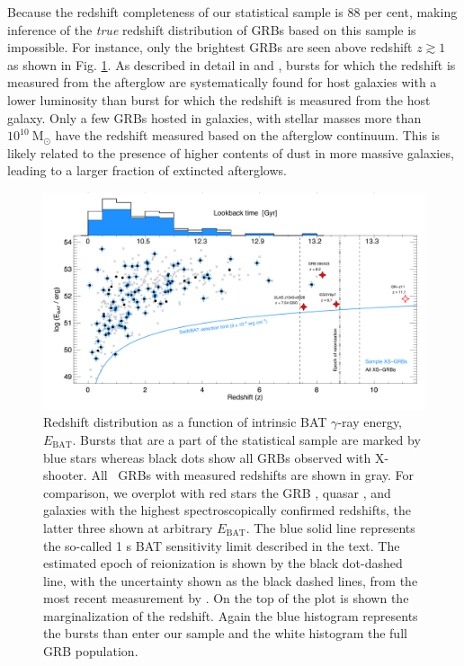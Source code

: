 \documentclass{aa}    %
\begin{document}
Because the redshift completeness of our statistical sample is 88 per cent,
making inference of the \textit{true} redshift distribution of GRBs based on
this sample is impossible. %
For instance, only the brightest GRBs are seen above redshift $z \gtrsim 1$ as
shown in Fig. \ref{fig:z}. As described in detail in \citet{Hjorth2012} and
\citet{Perley2016b}, bursts for which the redshift is measured from the
afterglow are systematically found for host galaxies with a lower luminosity
than burst for which the redshift is measured from the host galaxy. Only a few
GRBs hosted in galaxies, with stellar masses more than
$10^{10}~\mathrm{M}_\odot$ have the redshift measured based on the afterglow
continuum. This is likely related to the presence of higher contents of dust in
more massive galaxies, leading to a larger fraction of extincted afterglows.



\begin{figure}[!ht]
	\centering \includegraphics[width=16cm]{figures/XSGRB_redshift.pdf}
\caption{Redshift distribution as a function of intrinsic BAT $\gamma$-ray
	energy, $E_{\mathrm{BAT}}$. Bursts that are a part of the statistical sample
	are marked by blue stars whereas black dots show all GRBs observed with
	X-shooter. All \swift~GRBs with measured redshifts are shown in gray. For
	comparison, we overplot with red stars the GRB \citep{Tanvir2009b,
		Salvaterra2009a}, quasar \citep{Banados2017}, and galaxies \citep{Zitrin2015,
		Oesch2016} with the highest spectroscopically confirmed redshifts, the latter
	three shown at arbitrary $E_{\mathrm{BAT}}$. The blue solid line represents the
	so-called 1 s BAT sensitivity limit described in the text. The estimated epoch
	of reionization is shown by the black dot-dashed line, with the uncertainty
	shown as the black dashed lines, from the most recent measurement by
	\citet{Planck2015}. On the top of the plot is shown the marginalization of the
	redshift. Again the blue histogram represents the bursts than enter our sample
	and the white histogram the full GRB population. } \label{fig:z}
\end{figure}
\end{document}
